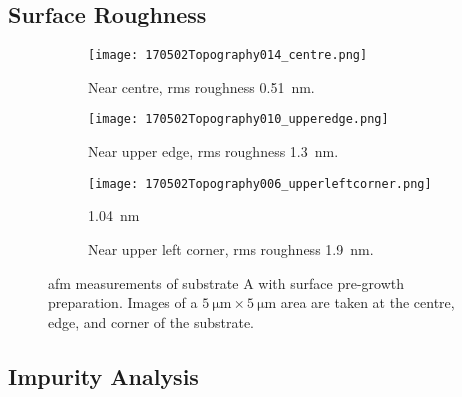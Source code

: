 \subsection{Surface Roughness}

\begin{figure}[htbp]
    \centering
    \begin{subfigure}[t]{\linewidth}
        \centering
        \texttt{[image: 170502Topography014\_centre.png]}
        \caption{Near centre, \ac{rms} roughness \SI{0.51}{\nano\metre}.} %
    \end{subfigure}%
    \par\bigskip
    \begin{subfigure}[t]{\linewidth}
        \centering
        \texttt{[image: 170502Topography010\_upperedge.png]}
        \caption{Near upper edge, \ac{rms} roughness \SI{1.3}{\nano\metre}.} %
    \end{subfigure}%
    \par\bigskip
    \begin{subfigure}[t]{\linewidth}
        \centering
        \texttt{[image: 170502Topography006\_upperleftcorner.png]}
        \caption{Near upper left corner, \ac{rms} roughness \SI{1.9}{\nano\metre}.}\SI{1,04}{\nano\metre}
    \end{subfigure}%
    \caption[\Ac{afm} of substrate A with surface pre-growth preparation.]{\Acf{afm} measurements of substrate A with surface pre-growth preparation. Images of a $\SI{5}{\micro\metre}\times\SI{5}{\micro\metre}$ area are taken at the centre, edge, and corner of the substrate.}\label{fig:afm_subAb}
\end{figure} %

\subsection{Impurity Analysis}

